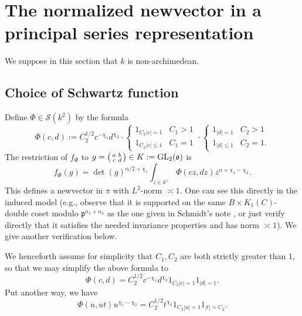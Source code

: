 \documentclass[reqno]{amsart} 
\begin{document}
\section{The normalized newvector in a principal series representation}
\label{sec:org5339323}
We suppose in this section that \(k\) is non-archimedean.

\subsection{Choice of Schwartz function}
\label{sec:orgbd005ab}
Define $\Phi \in \mathcal{S}(k^2)$ by the formula
\begin{equation*}
  \Phi(c,d) :=
  C_2^{1/2}
  c^{-\chi_1} d^{\chi_2} 
  \cdot
  \begin{cases}
    1_{C_2 |c| = 1}& C_1 > 1
    \\
    1_{C_2 |c| \leq 1} & C_1 = 1
  \end{cases}
  \cdot
  \begin{cases}
    1_{|d| = 1}& C_2 > 1
    \\
    1_{|d| \leq 1} & C_2 = 1.
  \end{cases}
\end{equation*}
The restriction of $f_\Phi$ to $g = \left(
  \begin{smallmatrix}
    a&b\\
    c&d
  \end{smallmatrix}
\right) \in K := \operatorname{GL}_2(\mathfrak{o})$ is
\begin{equation*}
  f_\Phi(g)
  =
  \det(g)^{\alpha/2+\chi_1}
  \int_{z \in k^\times} \Phi(c z, d z) z^{\alpha + \chi_1 - \chi_2}.
\end{equation*}
This defines a newvector in $\pi$ with $L^2$-norm $\asymp 1$.  One can see this directly in the induced model (e.g., observe that it is supported on the same $B \times K_1(C)$-double coset modulo $\mathfrak{p}^{n_1 + n_2}$ as the one given in Schmidt's note \cite{Sch02}, or just verify directly that it satisfies the needed invariance properties and has norm $\asymp 1$).  We give another verification below.

We henceforth assume for simplicity that $C_1, C_2$ are both strictly greater than $1$, so that we may simplify the above formula to
\begin{equation*}
  \Phi(c,d) =
  C_2^{1/2}
  c^{-\chi_1} d^{\chi_2} 
  1_{C_2 |c| = 1}
  1_{|d| = 1}.
\end{equation*}
Put another way, we have
\begin{equation*}
  \Phi(u, u t) u^{\chi_1 - \chi_2}
  =
  C_2^{1/2}
  t^{\chi_2}
  1_{C_2 |u| = 1}
  1_{|t| = C_2}.
\end{equation*}
\end{document}
